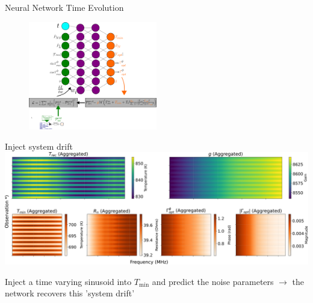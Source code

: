 \documentclass[aspectratio=169]{beamer}
\begin{document}

\begin{frame}{\small{Neural Network Time Evolution}}
    \begin{figure}
        \centering
        \includegraphics[width=0.5\textwidth]{images/nn_time.png}
    \end{figure}
\end{frame}

\begin{frame}{\small{Inject system drift}}
	\centering
	\includegraphics[width=\textwidth]{images/temps_combined_2d.png}
	\begin{tcolorbox}[colback=blue!5!white,colframe=blue!75!black,title=]
		Inject a time varying sinusoid into $T_{\text{min}}$ and predict the noise parameters $\rightarrow$ the network recovers this 'system drift'
	\end{tcolorbox}
\end{frame}
\end{document}
